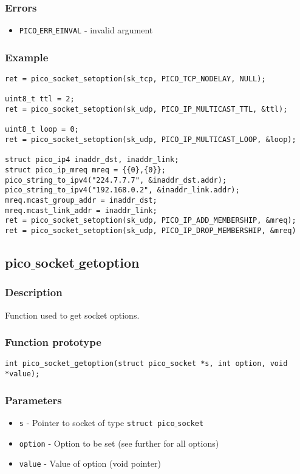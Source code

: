 \subsubsection*{Errors}
\begin{itemize}[noitemsep]
\item \texttt{PICO$\_$ERR$\_$EINVAL} - invalid argument
\end{itemize}

\subsubsection*{Example}
\begin{verbatim}
ret = pico_socket_setoption(sk_tcp, PICO_TCP_NODELAY, NULL);

uint8_t ttl = 2;
ret = pico_socket_setoption(sk_udp, PICO_IP_MULTICAST_TTL, &ttl);

uint8_t loop = 0;
ret = pico_socket_setoption(sk_udp, PICO_IP_MULTICAST_LOOP, &loop);

struct pico_ip4 inaddr_dst, inaddr_link;
struct pico_ip_mreq mreq = {{0},{0}};
pico_string_to_ipv4("224.7.7.7", &inaddr_dst.addr);
pico_string_to_ipv4("192.168.0.2", &inaddr_link.addr);
mreq.mcast_group_addr = inaddr_dst;
mreq.mcast_link_addr = inaddr_link;
ret = pico_socket_setoption(sk_udp, PICO_IP_ADD_MEMBERSHIP, &mreq);
ret = pico_socket_setoption(sk_udp, PICO_IP_DROP_MEMBERSHIP, &mreq)
\end{verbatim}


\subsection{pico$\_$socket$\_$getoption}

\subsubsection*{Description}
Function used to get socket options.

\subsubsection*{Function prototype}
\begin{verbatim}
int pico_socket_getoption(struct pico_socket *s, int option, void *value);
\end{verbatim}

\subsubsection*{Parameters}
\begin{itemize}[noitemsep]
\item \texttt{s} - Pointer to socket of type \texttt{struct pico$\_$socket}
\item \texttt{option} - Option to be set (see further for all options)
\item \texttt{value} - Value of option (void pointer)
\end{itemize}

